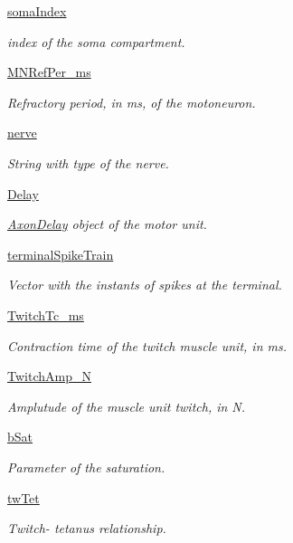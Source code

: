 \begin{DoxyCompactItemize}
\hyperlink{class_motor_unit_1_1_motor_unit_a7cd2be92814b5892bdd18dafd824da9f}{soma\-Index}
\begin{DoxyCompactList}\small\item\em index of the soma compartment. \end{DoxyCompactList}\item 
\hyperlink{class_motor_unit_1_1_motor_unit_abbdaa195ac00926d96d509ae01dcda05}{M\-N\-Ref\-Per\-\_\-ms}
\begin{DoxyCompactList}\small\item\em Refractory period, in ms, of the motoneuron. \end{DoxyCompactList}\item 
\hyperlink{class_motor_unit_1_1_motor_unit_a754ee6b88fc2a09899da9f9b13bfbf59}{nerve}
\begin{DoxyCompactList}\small\item\em String with type of the nerve. \end{DoxyCompactList}\item 
\hyperlink{class_motor_unit_1_1_motor_unit_abe82ffa1e293d10225b67870a962eab8}{Delay}
\begin{DoxyCompactList}\small\item\em \hyperlink{namespace_axon_delay}{Axon\-Delay} object of the motor unit. \end{DoxyCompactList}\item 
\hyperlink{class_motor_unit_1_1_motor_unit_a2e33990aaab69454943aa00db6b8d2eb}{terminal\-Spike\-Train}
\begin{DoxyCompactList}\small\item\em Vector with the instants of spikes at the terminal. \end{DoxyCompactList}\item 
\hyperlink{class_motor_unit_1_1_motor_unit_a083581c89ebb964e58721667307dd2bc}{Twitch\-Tc\-\_\-ms}
\begin{DoxyCompactList}\small\item\em Contraction time of the twitch muscle unit, in ms. \end{DoxyCompactList}\item 
\hyperlink{class_motor_unit_1_1_motor_unit_ad14af870eb3dd7468041853f2c6e8cab}{Twitch\-Amp\-\_\-\-N}
\begin{DoxyCompactList}\small\item\em Amplutude of the muscle unit twitch, in N. \end{DoxyCompactList}\item 
\hyperlink{class_motor_unit_1_1_motor_unit_a2256c241b36e0181e3530e6f791545a0}{b\-Sat}
\begin{DoxyCompactList}\small\item\em Parameter of the saturation. \end{DoxyCompactList}\item 
\hyperlink{class_motor_unit_1_1_motor_unit_a2a466c5f2f798901c1c438f9d57c2221}{tw\-Tet}
\begin{DoxyCompactList}\small\item\em Twitch-\/ tetanus relationship. \end{DoxyCompactList}\end{DoxyCompactItemize}


